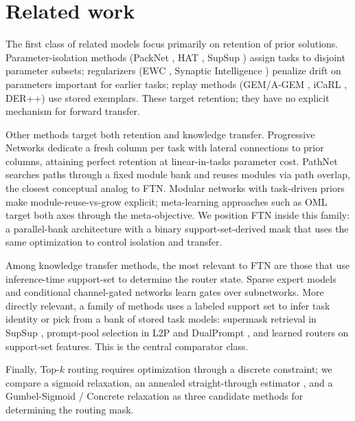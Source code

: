 \documentclass[11pt]{article}
\begin{document}
\section{Related work}\label{sec:related}

The first class of related models focus primarily on retention of prior solutions. Parameter-isolation methods (PackNet \citep{mallya2018packnet}, HAT \citep{serra2018overcoming}, SupSup \citep{wortsman2020supermasks}) assign tasks to disjoint parameter subsets; regularizers (EWC \citep{kirkpatrick2017overcoming}, Synaptic Intelligence \citep{zenke2017continual}) penalize drift on parameters important for earlier tasks; replay methods (GEM/A-GEM \citep{lopez2017gradient,chaudhry2018efficient}, iCaRL \citep{rebuffi2017icarl}, DER++) use stored exemplars. These target retention; they have no explicit mechanism for forward transfer.

Other methods target both retention and knowledge transfer. Progressive Networks \citep{rusu2016progressive} dedicate a fresh column per task with lateral connections to prior columns, attaining perfect retention at linear-in-tasks parameter cost. PathNet \citep{fernando2017pathnet} searches paths through a fixed module bank and reuses modules via path overlap, the closest conceptual analog to FTN. Modular networks with task-driven priors \citep{veniat2021mntdp} make module-reuse-vs-grow explicit; meta-learning approaches such as OML \citep{javed2019oml} target both axes through the meta-objective. We position FTN inside this family: a parallel-bank architecture with a binary support-set-derived mask that uses the same optimization to control isolation and transfer.

Among knowledge transfer methods, the most relevant to FTN are those that use inference-time support-set to determine the router state. Sparse expert models \citep{shazeer2017outrageously,fedus2022switch} and conditional channel-gated networks \citep{abati2020conditional} learn gates over subnetworks. More directly relevant, a family of methods uses a labeled support set to infer task identity or pick from a bank of stored task models: supermask retrieval in SupSup \citep{wortsman2020supermasks}, prompt-pool selection in L2P and DualPrompt \citep{wang2022learning,wang2022dualprompt}, and learned routers on support-set features. This is the central comparator class.

Finally, Top-$k$ routing requires optimization through a discrete constraint; we compare a sigmoid relaxation, an annealed straight-through estimator \citep{bengio2013estimating}, and a Gumbel-Sigmoid / Concrete relaxation \citep{jang2017categorical,maddison2017concrete} as three candidate methods for determining the routing mask.
\end{document}
